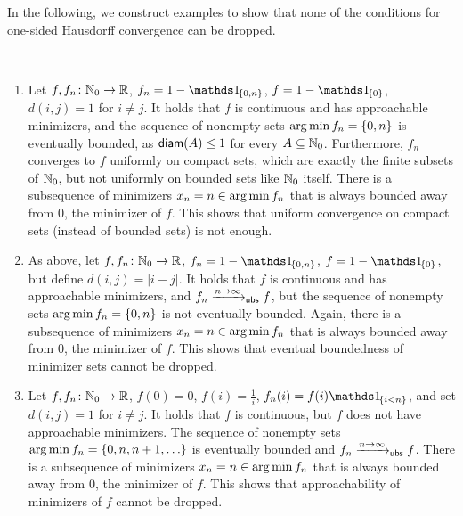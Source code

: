 %
In the following, we construct examples to show that none of the conditions for one-sided Hausdorff convergence can be dropped.
%
\begin{example}\label{exa:alt:necessary}
\mbox{ }
\begin{enumerate}[label=(\roman*)]
	\item 
	Let $f,f_n\colon \mathbb{N}_0 \to \mathbb{R}$, $f_n = 1-\indOf{\cb{0,n}}$, $f = 1-\indOf{\cb{0}}$, $d(i,j) = 1$ for $i\neq j$.
	It holds that $f$ is continuous and has approachable minimizers, and the sequence of nonempty sets $\operatorname*{arg\,min} f_n = \left\lbrace 0,n \right\rbrace$ is eventually bounded, as $\operatorname{\mathsf{diam}}(A)\leq1$ for every $A\subseteq\mathbb{N}_0$. Furthermore, $f_n$ converges to $f$ uniformly on compact sets, which are exactly the finite subsets of $\mathbb{N}_0$, but not uniformly on bounded sets like $\mathbb{N}_0$ itself.
	There is a subsequence of minimizers $x_n=n\in \operatorname*{arg\,min} f_n$ that is always bounded away from $0$, the minimizer of $f$.
	This shows that uniform convergence on compact sets (instead of bounded sets) is not enough.
	\item
	As above, let $f, f_n\colon \mathbb{N}_0 \to \mathbb{R}$, $f_n = 1-\indOf{\cb{0,n}}$, $f = 1-\indOf{\cb{0}}$, but define $d(i,j) = |i-j|$.
	It holds that $f$ is continuous and has approachable minimizers, and $f_n\xrightarrow{n\to\infty}_{\mathsf{ubs}} f$, but the sequence of nonempty sets $\operatorname*{arg\,min} f_n = \left\lbrace 0,n \right\rbrace$ is not eventually bounded. 
	Again, there is a subsequence of minimizers $x_n=n\in \operatorname*{arg\,min} f_n$ that is always bounded away from $0$, the minimizer of $f$.
	This shows that eventual boundedness of minimizer sets cannot be dropped.
	\item
	Let $f,f_n\colon \mathbb{N}_0 \to \mathbb{R}$, $f(0) = 0$, $f(i) = \frac1i$, $f_n(i) = f(i)\indOfEvent{i < n}$, and set $d(i,j) = 1$  for $i\neq j$.
	It holds that $f$ is continuous, but $f$ does not have approachable minimizers. The sequence of nonempty sets $\argmin f_n = \cb{0,n, n+1, \dots}$ is eventually bounded and $f_n\xrightarrow{n\to\infty}_{\mathsf{ubs}} f$.
	There is a subsequence of minimizers $x_n=n\in \operatorname*{arg\,min} f_n$ that is always bounded away from $0$, the minimizer of $f$.
	This shows that approachability of minimizers of $f$ cannot be dropped.
\end{enumerate}
\end{example}
%
%
